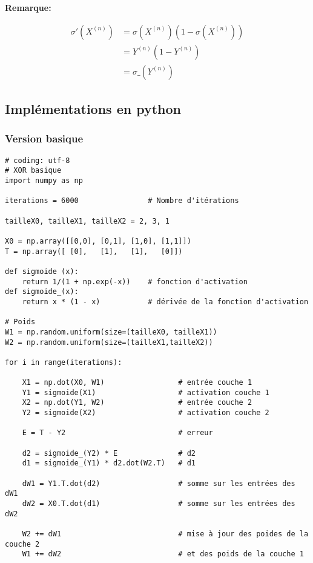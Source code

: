 \documentclass[11pt]{article}
\begin{document}
{\textbf{Remarque:}

\begin{align}
\sigma'(X^{(n)}) & = \sigma(X^{(n)})(1-\sigma(X^{(n)}))\\
                     & = Y^{(n)}(1-Y^{(n)})\\
                     & = \sigma\_(Y^{(n)})
\end{align}

\subsection{Implémentations en python}
\label{sec-4-2}

\subsubsection{Version basique}
\label{sec-4-2-1}

\begin{verbatim}
# coding: utf-8
# XOR basique
import numpy as np

iterations = 6000                # Nombre d'itérations

tailleX0, tailleX1, tailleX2 = 2, 3, 1

X0 = np.array([[0,0], [0,1], [1,0], [1,1]])
T = np.array([ [0],   [1],   [1],   [0]])

def sigmoide (x):
    return 1/(1 + np.exp(-x))    # fonction d'activation
def sigmoide_(x):
    return x * (1 - x)           # dérivée de la fonction d'activation

# Poids
W1 = np.random.uniform(size=(tailleX0, tailleX1))
W2 = np.random.uniform(size=(tailleX1,tailleX2))

for i in range(iterations):

    X1 = np.dot(X0, W1)                 # entrée couche 1
    Y1 = sigmoide(X1)                   # activation couche 1
    X2 = np.dot(Y1, W2)                 # entrée couche 2
    Y2 = sigmoide(X2)                   # activation couche 2

    E = T - Y2                          # erreur

    d2 = sigmoide_(Y2) * E              # d2  
    d1 = sigmoide_(Y1) * d2.dot(W2.T)   # d1 

    dW1 = Y1.T.dot(d2)                  # somme sur les entrées des dW1
    dW2 = X0.T.dot(d1)                  # somme sur les entrées des dW2

    W2 += dW1                           # mise à jour des poides de la couche 2
    W1 += dW2                           # et des poids de la couche 1


\end{verbatim}}
\end{document}
